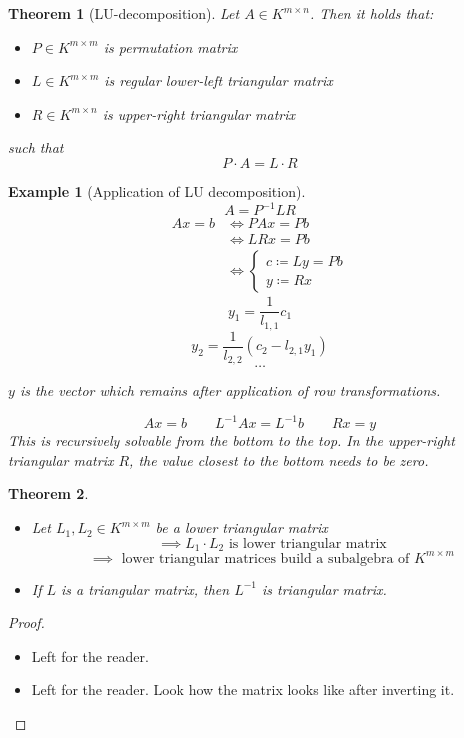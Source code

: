 \documentclass[a4paper,landscape,twocolumn]{article}
\newtheorem{theorem}{Theorem}[section]
\newtheorem{ex}{Example}[section]
\begin{document}
\begin{theorem}[LU-decomposition]
  \label{satz-6.46}
  Let $A \in K^{m\times n}$.
  Then it holds that:
  \begin{itemize}
    \item $P \in K^{m\times m}$ is permutation matrix
    \item $L \in K^{m\times m}$ is regular lower-left triangular matrix
    \item $R \in K^{m\times n}$ is upper-right triangular matrix
  \end{itemize}
  such that
  \[ P \cdot A = L \cdot R \]
\end{theorem}
\begin{ex}[Application of LU decomposition]
  \[ A = P^{-1} L R \]
  \begin{align*}
    Ax = b &\iff PAx = Pb \\
      &\iff LRx = Pb \\
      &\iff \begin{cases}
          c \coloneqq Ly = Pb \\
          y \coloneqq Rx
        \end{cases}
  \end{align*}
  \[ y_1 = \frac1{l_{1,1}} c_1 \]
  \[ y_2 = \frac1{l_{2,2}} (c_2 - l_{2,1} y_1) \]
  \[ \ldots \]

  $y$ is the vector which remains after application of row transformations.

  \[ Ax = b \qquad L^{-1} A x = L^{-1} b \qquad Rx = y \]
  This is recursively solvable from the bottom to the top.
  In the upper-right triangular matrix $R$, the value closest to the bottom
  needs to be zero.
\end{ex}

\begin{theorem}
  \label{lemma-6.47}
  \begin{itemize}
    \item Let $L_1, L_2 \in K^{m\times m}$ be a lower triangular matrix
      \[ \implies L_1 \cdot L_2 \text{ is lower triangular matrix} \]
      \[ \implies \text{ lower triangular matrices build a subalgebra of } K^{m\times m} \]
    \item If $L$ is a triangular matrix, then $L^{-1}$ is triangular matrix.
  \end{itemize}
\end{theorem}
\begin{proof}
  \begin{itemize}
    \item Left for the reader.
    \item Left for the reader. Look how the matrix looks like after inverting it.
  \end{itemize}
\end{proof}
\end{document}
